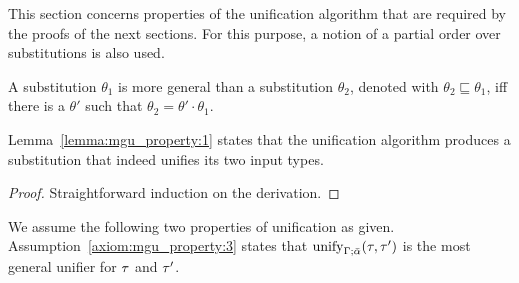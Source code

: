 This section concerns properties of the unification algorithm that are required by the proofs of
the next sections. For this purpose, a notion of a partial order over substitutions is also
used.

\begin{definition}
A substitution $\theta_1$ is more general than a substitution $\theta_2$, denoted with
$\theta_2\sqsubseteq\theta_1$, iff there is a $\theta'$ such that $\theta_2 = \theta'\cdot\theta_1$.
\end{definition}

Lemma~\ref{lemma:mgu_property:1} states that the unification algorithm produces
a substitution that indeed unifies its two input types.\\

{\centering
{}}

\begin{proof}
Straightforward induction on the derivation.
\end{proof}

We assume the following two properties of unification as given.\\

Assumption~\ref{axiom:mgu_property:3} states that ${\mathrm{unify}_{\Gamma;\bar{\alpha}}(\tau,\tau')}$ is the most general unifier for $\tau$ and $\tau'$.\\

